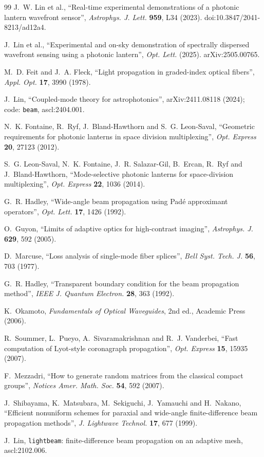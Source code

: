 \documentclass[11pt,a4paper]{article}
\begin{document}
\begin{thebibliography}{99}
J.~W. Lin et al., ``Real-time experimental demonstrations of a photonic lantern wavefront sensor'', \emph{Astrophys. J. Lett.} \textbf{959}, L34 (2023). doi:10.3847/2041-8213/ad12a4.

J.~Lin et al., ``Experimental and on-sky demonstration of spectrally dispersed wavefront sensing using a photonic lantern'', \emph{Opt. Lett.} (2025). arXiv:2505.00765.

M.~D. Feit and J.~A. Fleck, ``Light propagation in graded-index optical fibers'', \emph{Appl. Opt.} \textbf{17}, 3990 (1978).

J.~Lin, ``Coupled-mode theory for astrophotonics'', arXiv:2411.08118 (2024); code: \texttt{beam}, ascl:2404.001.

N.~K. Fontaine, R.~Ryf, J.~Bland-Hawthorn and S.~G. Leon-Saval, ``Geometric requirements for photonic lanterns in space division multiplexing'', \emph{Opt. Express} \textbf{20}, 27123 (2012).

S.~G. Leon-Saval, N.~K. Fontaine, J.~R. Salazar-Gil, B.~Ercan, R.~Ryf and J.~Bland-Hawthorn, ``Mode-selective photonic lanterns for space-division multiplexing'', \emph{Opt. Express} \textbf{22}, 1036 (2014).

G.~R. Hadley, ``Wide-angle beam propagation using Pad\'e approximant operators'', \emph{Opt. Lett.} \textbf{17}, 1426 (1992).

O.~Guyon, ``Limits of adaptive optics for high-contrast imaging'', \emph{Astrophys. J.} \textbf{629}, 592 (2005).

D.~Marcuse, ``Loss analysis of single-mode fiber splices'', \emph{Bell Syst. Tech. J.} \textbf{56}, 703 (1977).

G.~R. Hadley, ``Transparent boundary condition for the beam propagation method'', \emph{IEEE J. Quantum Electron.} \textbf{28}, 363 (1992).

K.~Okamoto, \emph{Fundamentals of Optical Waveguides}, 2nd ed., Academic Press (2006).

R.~Soummer, L.~Pueyo, A.~Sivaramakrishnan and R.~J. Vanderbei, ``Fast computation of Lyot-style coronagraph propagation'', \emph{Opt. Express} \textbf{15}, 15935 (2007).

F.~Mezzadri, ``How to generate random matrices from the classical compact groups'', \emph{Notices Amer. Math. Soc.} \textbf{54}, 592 (2007).

J.~Shibayama, K.~Matsubara, M.~Sekiguchi, J.~Yamauchi and H.~Nakano, ``Efficient nonuniform schemes for paraxial and wide-angle finite-difference beam propagation methods'', \emph{J. Lightwave Technol.} \textbf{17}, 677 (1999).

J.~Lin, \texttt{lightbeam}: finite-difference beam propagation on an adaptive mesh, ascl:2102.006.

\end{thebibliography}
\end{document}
